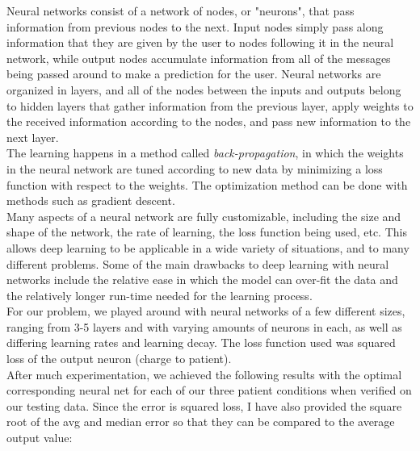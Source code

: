\documentclass[letterpaper,11pt]{article}
\begin{document}
Neural networks consist of a network of nodes, or "neurons", that pass information from previous nodes to the next. Input nodes simply pass along information that they are given by the user to nodes following it in the neural network, while output nodes accumulate information from all of the messages being passed around to make a prediction for the user. Neural networks are organized in layers, and all of the nodes between the inputs and outputs belong to hidden layers that gather information from the previous layer, apply weights to the received information according to the nodes, and pass new information to the next layer. \\

The learning happens in a method called \textit{back-propagation}, in which the weights in the neural network are tuned according to new data by minimizing a loss function with respect to the weights. The optimization method can be done with methods such as gradient descent.\\ 

Many aspects of a neural network are fully customizable, including the size and shape of the network, the rate of learning, the loss function being used, etc. This allows deep learning to be applicable in a wide variety of situations, and to many different problems. Some of the main drawbacks to deep learning with neural networks include the relative ease in which the model can over-fit the data and the relatively longer run-time needed for the learning process. \\

For our problem, we played around with neural networks of a few different sizes, ranging from 3-5 layers and with varying amounts of neurons in each, as well as differing learning rates and learning decay. The loss function used was squared loss of the output neuron (charge to patient).\\

After much experimentation, we achieved the following results with the optimal corresponding neural net for each of our three patient conditions when verified on our testing data. Since the error is squared loss, I have also provided the square root of the avg and median error so that they can be compared to the average output value:\\
\end{document}
